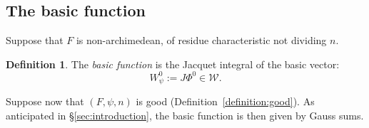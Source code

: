 \documentclass[reqno]{amsart}
\theoremstyle{plain}
\theoremstyle{definition}
\newtheorem{definition}[theorem]{Definition}
\theoremstyle{itplain}
\numberwithin{equation}{section}
\numberwithin{theorem}{section}
\begin{document}
\subsection{The basic function}\label{sec:jacquet-gauss}
Suppose that $F$ is non-archimedean, of residue characteristic not dividing $n$.
\begin{definition}\label{definition:basic-function}
  The \emph{basic function} is the Jacquet integral of the basic vector:
  \begin{equation*}
    W_\psi^0 := J \Phi^0 \in \mathcal{W}.
  \end{equation*}
\end{definition}
Suppose now that $(F, \psi, n)$ is good (Definition~\ref{definition:good}).  As anticipated in \S\ref{sec:introduction}, the basic function is then given by Gauss sums.
\end{document}
